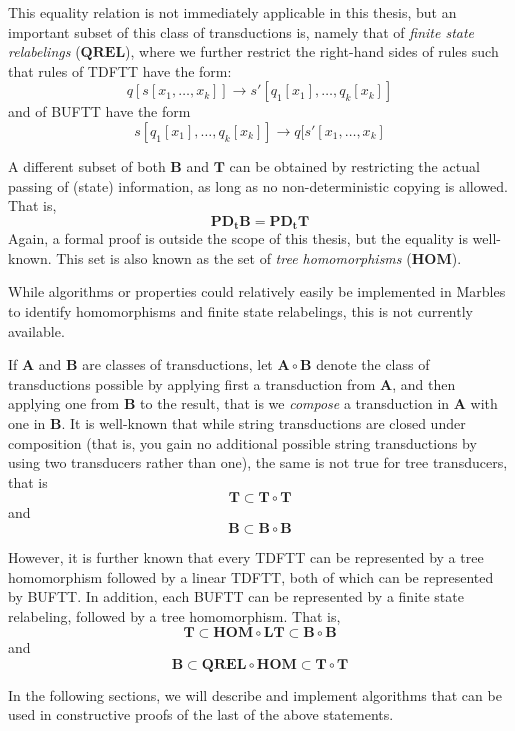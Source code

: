This equality relation is not immediately applicable in this thesis, but an
important subset of this class of transductions is, namely that of
\emph{finite state relabelings} ($\mathbf{QREL}$), where we further
restrict the right-hand sides of rules such that rules of TDFTT have the
form:
$$q[s[x_1,\ldots,x_k]] \rightarrow s'[q_1[x_1],\ldots,q_k[x_k]]$$ 
and of BUFTT have the form
$$s[q_1[x_1],\ldots,q_k[x_k]] \rightarrow q[s'[x_1,\ldots,x_k]$$

A different subset of both $\mathbf{B}$ and $\mathbf{T}$ can be obtained by
restricting the actual passing of (state) information, as long as no
non-deterministic copying is allowed. That is, 
$$\mathbf{PD_tB} = \mathbf{PD_tT}$$
Again, a formal proof is outside the scope of this thesis, but the equality
is well-known. This set is also known as the set of \emph{tree homomorphisms} 
($\mathbf{HOM}$).

While algorithms or properties could relatively easily be implemented in
Marbles to identify homomorphisms and finite state relabelings, this is not
currently available.

If $\mathbf{A}$ and $\mathbf{B}$ are classes of transductions, let
$\mathbf{A}\circ\mathbf{B}$ denote the class of transductions possible by
applying first a transduction from $\mathbf{A}$, and then applying one from
$\mathbf{B}$ to the result, that is we \emph{compose} a transduction in
$\mathbf{A}$ with one in $\mathbf{B}$. It is well-known that while string
transductions are closed under composition (that is, you gain no additional
possible string transductions by using two transducers rather than one),
the same is not true for tree transducers, that is
$$\mathbf{T} \subset \mathbf{T} \circ \mathbf{T}$$ and
$$\mathbf{B} \subset \mathbf{B} \circ \mathbf{B}$$

However, it is further known that every TDFTT can be represented by a
tree homomorphism followed by a linear TDFTT, both of which can be
represented by BUFTT. In addition, each BUFTT can be represented by a
finite state relabeling, followed by a tree homomorphism. That is,
$$\mathbf{T} \subset \mathbf{HOM} \circ \mathbf{LT} \subset \mathbf{B}
\circ \mathbf{B}$$ and
$$\mathbf{B} \subset \mathbf{QREL} \circ \mathbf{HOM} \subset \mathbf{T}
\circ \mathbf{T}$$

In the following sections, we will describe and implement algorithms that
can be used in constructive proofs of the last of the above statements.

